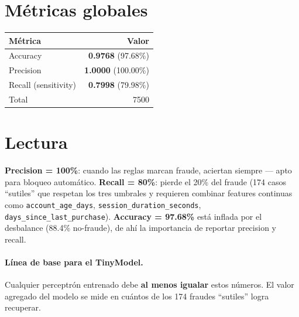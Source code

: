\documentclass[11pt,a4paper]{article}
\begin{document}
\section*{M\'etricas globales}

\begin{center}
\renewcommand{\arraystretch}{1.3}
\begin{tabular}{l r}
\toprule
\textbf{M\'etrica} & \textbf{Valor} \\
\midrule
Accuracy            & \textbf{0.9768} \quad (97.68\%) \\
Precision           & \textbf{1.0000} \quad (100.00\%) \\
Recall (sensitivity) & \textbf{0.7998} \quad (79.98\%) \\
\midrule
Total               & 7500 \\
\bottomrule
\end{tabular}
\end{center}

\section*{Lectura}

\textbf{Precision = 100\%}: cuando las reglas marcan fraude, aciertan siempre
--- apto para bloqueo autom\'atico. \textbf{Recall = 80\%}: pierde el 20\% del
fraude (174 casos ``sutiles'' que respetan los tres umbrales y requieren combinar
features continuas como \texttt{account\_age\_days},
\texttt{session\_duration\_seconds}, \texttt{days\_since\_last\_purchase}).
\textbf{Accuracy = 97.68\%} est\'a inflada por el desbalance (88.4\% no-fraude),
de ah\'i la importancia de reportar precision y recall.

\paragraph{L\'inea de base para el TinyModel.} Cualquier perceptr\'on entrenado
debe \textbf{al menos igualar} estos n\'umeros. El valor agregado del modelo se
mide en cu\'antos de los 174 fraudes ``sutiles'' logra recuperar.
\end{document}

